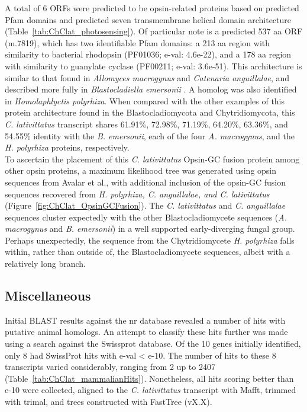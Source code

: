 \indent A total of 6 ORFs were predicted to be opsin-related proteins based on predicted Pfam domains and predicted seven transmembrane helical domain architecture (Table~\ref{tab:ChClat_photosensing}). Of particular note is a predicted 537 aa ORF (m.7819), which has two identifiable Pfam domains: a 213 aa region with similarity to bacterial rhodopsin (PF01036; e-val: 4.6e-22), and a 178 aa region with similarity to guanylate cyclase (PF00211; e-val: 3.6e-51). This architecture is similar to that found in \textit{Allomyces macrogynus} and \textit{Catenaria anguillalae}, and described more fully in \textit{Blastocladiella emersonii} \cite{Avelar2014}. A homolog was also identified in \textit{Homolaphlyctis polyrhiza}. When compared with the other examples of this protein architecture found in the Blastocladiomycota and Chytridiomycota, this \textit{C. lativittatus} transcript shares 61.91\%, 72.98\%, 71.19\%, 64.20\%, 63.36\%, and 54.55\% identity with the \textit{B. emersonii}, each of the four \textit{A. macrogynus}, and the \textit{H. polyrhiza} proteins, respectively.\\
\indent To ascertain the placement of this \textit{C. lativittatus} Opsin-GC fusion protein among other opsin proteins, a maximum likelihood tree was generated using opsin sequences from Avalar et al., with additional inclusion of the opsin-GC fusion sequences recovered from \textit{H. polyrhiza, C. anguillalae, and C. lativittatus} (Figure~\ref{fig:ChClat_OpsinGCFusion}). The \textit{C. lativittatus} and \textit{C. anguillalae} sequences cluster expectedly with the other Blastocladiomycete sequences (\textit{A. macrogynus} and \textit{B. emersonii}) in a well supported early-diverging fungal group. Perhaps unexpectedly, the sequence from the Chytridiomycete \textit{H. polyrhiza} falls within, rather than outside of, the Blastocladiomycete sequences, albeit with a relatively long branch.\\
\subsection*{Miscellaneous}
Initial BLAST results against the nr database revealed a number of hits with putative animal homologs. An attempt to classify these hits further was made using a search against the Swissprot database. Of the 10 genes initially identified, only 8 had SwissProt hits with e-val < e-10. The number of hits to these 8 transcripts varied considerably, ranging from 2 up to 2407 (Table~\ref{tab:ChClat_mammalianHits}). Nonetheless, all hits scoring better than e-10 were collected, aligned to the \textit{C. lativittatus} transcript with Mafft, trimmed with trimal, and trees constructed with FastTree (vX.X).\\

